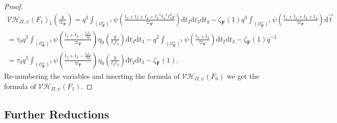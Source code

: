 \documentclass[A4]{amsart}
\numberwithin{equation}{section} \everymath{\displaystyle}
\newcommand{\ud}{\mathrm{d}}
\newcommand{\F}{\mathbf{F}}
\newcommand{\vO}{\mathcal{O}}
\newcommand{\VorH}{\mathcal{VH}}
\begin{document}
\begin{proof}
\begin{multline*}
	\VorH_{\Pi,\psi}(F_1)_1 \left( \tfrac{y}{\varpi_{\F}} \right) = q^{3} \int_{(\vO_{\F}^{\times})^3} \psi \left( \tfrac{t_2+t_3+t_4 + t_2^{-1}t_3^{-1}t_4^2y}{\varpi_{\F}} \right) \ud t_2 \ud t_3 \ud t_4 - \zeta_{\F}(1) q^{3} \int_{(\vO_{\F}^{\times})^4} \psi \left( \tfrac{t_1+t_2+t_3+t_4}{\varpi_{\F}} \right) \ud \vec{t} \\
	= \tau_0 q^3 \int_{(\vO_{\F}^{\times})^2} \psi \left( \tfrac{t_2+t_3-\frac{t_2t_3}{4y}}{\varpi_{\F}} \right) \eta_0 \left( \tfrac{y}{t_2t_3} \right) \ud t_2 \ud t_3 - q^2 \int_{(\vO_{\F}^{\times})^2} \psi \left( \tfrac{t_2+t_3}{\varpi_{\F}} \right) \ud t_2 \ud t_3 - \zeta_{\F}(1) q^{-1} \\
	= \tau_0 q^3 \int_{(\vO_{\F}^{\times})^2} \psi \left( \tfrac{t_2+t_3-\frac{t_2t_3}{4y}}{\varpi_{\F}} \right) \eta_0 \left( \tfrac{y}{t_2t_3} \right) \ud t_2 \ud t_3 - \zeta_{\F}(1).
\end{multline*}
	Re-numbering the variables and inserting the formula of $\VorH_{\Pi,\psi}(F_0)$ we get the formula of $\VorH_{\Pi,\psi}(F_1)$.
\end{proof}


	\subsection{Further Reductions}
\end{document}
